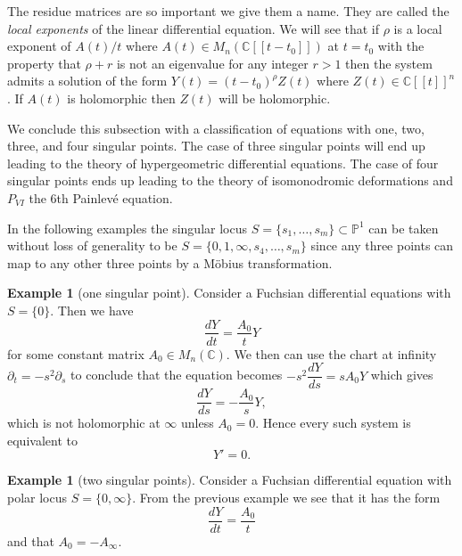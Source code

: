 \documentclass[]{book}
\numberwithin{equation}{section}
\theoremstyle{definition}
\newtheorem{example}[theorem]{Example}
\theoremstyle{remark}
\newcommand{\CC}{\mathbb{C}}
\newcommand{\PP}{\mathbb{P}}
\begin{document}
The residue matrices are so important we give them a name.
They are called the \emph{local exponents} of the linear differential equation. 
We will see that if $\rho$ is a local exponent of $A(t)/t$ where  $A(t)\in M_n(\CC[[t-t_0]])$ at $t=t_0$ with the property that $\rho+r$ is not an eigenvalue for any integer $r>1$ then the system admits a solution of the form $Y(t) = (t-t_0)^{\rho}Z(t)$ where $Z(t) \in \CC[[t]]^n$. 
If $A(t)$ is holomorphic then $Z(t)$ will be holomorphic.

We conclude this subsection with a classification of equations with one, two, three, and four singular points. 
The case of three singular points will end up leading to the theory of hypergeometric differential equations. 
The case of four singular points ends up leading to the theory of isomonodromic deformations and $P_{VI}$ the 6th Painlev\'{e} equation.

In the following examples the singular locus $S = \lbrace s_1,\ldots,s_m \rbrace \subset \PP^1$ can be taken without loss of generality to be $S=\lbrace 0,1,\infty,s_4,\ldots,s_m\rbrace$ since any three points can map to any other three points by a M\"obius transformation. 
\begin{example}[one singular point]
	Consider a Fuchsian differential equations with $S = \lbrace 0 \rbrace$. 
	Then we have 
	 $$ \dfrac{dY}{dt}= \frac{A_0}{t} Y $$
	for some constant matrix $A_0 \in M_n(\CC)$. 
	We then can use the chart at infinity $\partial_t = -s^2 \partial_s$ to conclude that the equation becomes $-s^2 \dfrac{dY}{ds} = s A_0 Y$ which gives 
	 $$ \dfrac{dY}{ds} = -\frac{A_0}{s}Y,$$
	which is not holomorphic at $\infty$ unless $A_0 = 0$. 
	Hence every such system is equivalent to 
	$$Y'=0.$$
\end{example}

\begin{example}[two singular points]
	Consider a Fuchsian differential equation with polar locus $S = \lbrace 0, \infty \rbrace$. 
	From the previous example we see that it has the form 
	 $$ \frac{dY}{dt} = \frac{A_0}{t} $$
	and that $A_0 = -A_{\infty}$.
\end{example}
\end{document}
